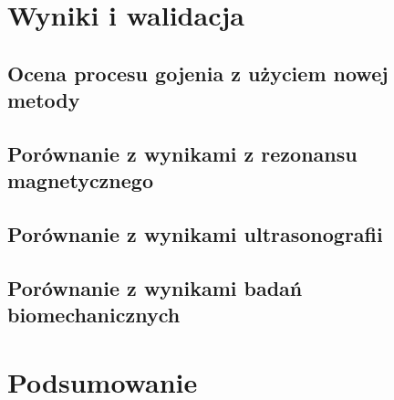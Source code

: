 \chapter{Wyniki i walidacja}


\section{Ocena procesu gojenia z użyciem nowej metody}
\section{Porównanie z wynikami z rezonansu magnetycznego}
\section{Porównanie z wynikami ultrasonografii}
\section{Porównanie z wynikami badań biomechanicznych}


\chapter{Podsumowanie}